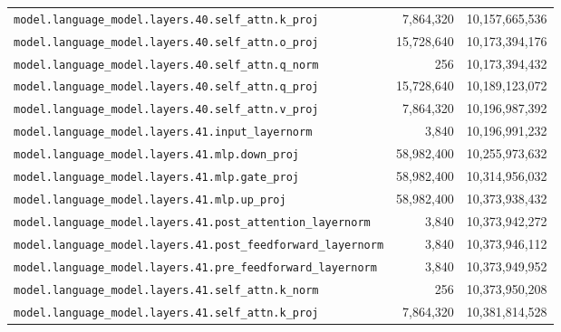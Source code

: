 \documentclass[10pt,a4paper]{article}
\theoremstyle{definition}
\begin{document}
\begin{appendices}
\begin{longtable}{p{9.5cm}rr}
\texttt{model.\allowbreak{}language\_model.\allowbreak{}layers.\allowbreak{}40.\allowbreak{}self\_attn.\allowbreak{}k\_proj} & 7,864,320 & 10,157,665,536 \\
\texttt{model.\allowbreak{}language\_model.\allowbreak{}layers.\allowbreak{}40.\allowbreak{}self\_attn.\allowbreak{}o\_proj} & 15,728,640 & 10,173,394,176 \\
\texttt{model.\allowbreak{}language\_model.\allowbreak{}layers.\allowbreak{}40.\allowbreak{}self\_attn.\allowbreak{}q\_norm} & 256 & 10,173,394,432 \\
\texttt{model.\allowbreak{}language\_model.\allowbreak{}layers.\allowbreak{}40.\allowbreak{}self\_attn.\allowbreak{}q\_proj} & 15,728,640 & 10,189,123,072 \\
\texttt{model.\allowbreak{}language\_model.\allowbreak{}layers.\allowbreak{}40.\allowbreak{}self\_attn.\allowbreak{}v\_proj} & 7,864,320 & 10,196,987,392 \\
\texttt{model.\allowbreak{}language\_model.\allowbreak{}layers.\allowbreak{}41.\allowbreak{}input\_layernorm} & 3,840 & 10,196,991,232 \\
\texttt{model.\allowbreak{}language\_model.\allowbreak{}layers.\allowbreak{}41.\allowbreak{}mlp.\allowbreak{}down\_proj} & 58,982,400 & 10,255,973,632 \\
\texttt{model.\allowbreak{}language\_model.\allowbreak{}layers.\allowbreak{}41.\allowbreak{}mlp.\allowbreak{}gate\_proj} & 58,982,400 & 10,314,956,032 \\
\texttt{model.\allowbreak{}language\_model.\allowbreak{}layers.\allowbreak{}41.\allowbreak{}mlp.\allowbreak{}up\_proj} & 58,982,400 & 10,373,938,432 \\
\texttt{model.\allowbreak{}language\_model.\allowbreak{}layers.\allowbreak{}41.\allowbreak{}post\_attention\_layernorm} & 3,840 & 10,373,942,272 \\
\texttt{model.\allowbreak{}language\_model.\allowbreak{}layers.\allowbreak{}41.\allowbreak{}post\_feedforward\_layernorm} & 3,840 & 10,373,946,112 \\
\texttt{model.\allowbreak{}language\_model.\allowbreak{}layers.\allowbreak{}41.\allowbreak{}pre\_feedforward\_layernorm} & 3,840 & 10,373,949,952 \\
\texttt{model.\allowbreak{}language\_model.\allowbreak{}layers.\allowbreak{}41.\allowbreak{}self\_attn.\allowbreak{}k\_norm} & 256 & 10,373,950,208 \\
\texttt{model.\allowbreak{}language\_model.\allowbreak{}layers.\allowbreak{}41.\allowbreak{}self\_attn.\allowbreak{}k\_proj} & 7,864,320 & 10,381,814,528 \\

\end{longtable}
\end{appendices}
\end{document}
